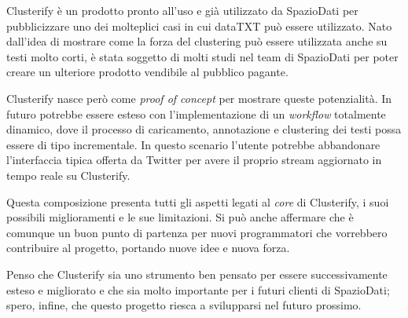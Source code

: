 	Clusterify è un prodotto pronto all'uso e già utilizzato da SpazioDati per pubblicizzare  uno dei molteplici casi in cui dataTXT può essere utilizzato. Nato dall'idea di mostrare come la forza del clustering può essere utilizzata anche su testi molto corti, è stata soggetto di molti studi nel team di SpazioDati per poter creare un ulteriore prodotto vendibile al pubblico pagante.

	Clusterify nasce però come \emph{proof of concept} per mostrare queste potenzialità. In futuro potrebbe essere esteso con l'implementazione di un \emph{workflow} totalmente dinamico, dove il processo di caricamento, annotazione e clustering dei testi possa essere di tipo incrementale. In questo scenario l'utente potrebbe abbandonare l'interfaccia tipica offerta da Twitter per avere il proprio stream aggiornato in tempo reale su Clusterify.

	Questa composizione presenta tutti gli aspetti legati al \emph{core} di Clusterify, i suoi possibili miglioramenti e le sue limitazioni. Si può anche affermare che è comunque un buon punto di partenza per nuovi programmatori che vorrebbero contribuire al progetto, portando nuove idee e nuova forza.

	Penso che Clusterify sia uno strumento ben pensato per essere successivamente esteso e migliorato e che sia molto importante per i futuri clienti di SpazioDati; spero, infine, che questo progetto riesca a svilupparsi nel futuro prossimo.